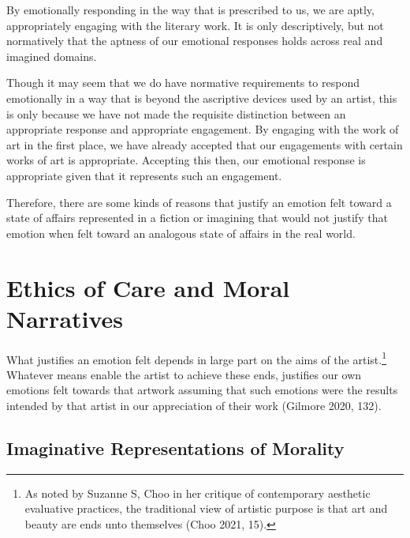\documentclass[12pt]{book}
\theoremstyle{definition}
\theoremstyle{remark}
\begin{document}
By emotionally responding in the way that is prescribed to us, we are aptly, appropriately engaging with the literary work. It is only descriptively, but not normatively that the aptness of our emotional responses holds across real and imagined domains.

Though it may seem that we do have normative requirements to respond emotionally in a way that is beyond the ascriptive devices used by an artist, this is only because we have not made the requisite distinction between an appropriate response and appropriate engagement. By engaging with the work of art in the first place, we have already accepted that our engagements with certain works of art is appropriate. Accepting this then, our emotional response is appropriate given that it represents such an engagement.

Therefore, there are some kinds of reasons that justify an emotion felt toward a state of affairs represented in a fiction or imagining that would not justify that emotion when felt toward an analogous state of affairs in the real world.

\section{Ethics of Care and Moral Narratives}\label{ethics-of-care-and-moral-narratives}

What justifies an emotion felt depends in large part on the aims of the artist.\footnote{As noted by Suzanne S, Choo in her critique of contemporary aesthetic evaluative practices, the traditional view of artistic purpose is that art and beauty are ends unto themselves (Choo 2021, 15).} Whatever means enable the artist to achieve these ends, justifies our own emotions felt towards that artwork assuming that such emotions were the results intended by that artist in our appreciation of their work (Gilmore 2020, 132).

\subsection*{Imaginative Representations of Morality}\label{imaginative-representations-of-morality}
\end{document}

